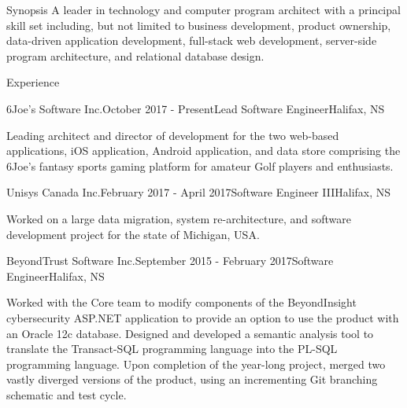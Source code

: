 \documentclass{resume} %
\begin{document}
\begin{rSection}{Synopsis}
A leader in technology and computer program architect with a principal skill set including, but not limited to business development, product ownership, data-driven application development, full-stack web development, server-side program architecture, and relational database design.
\end{rSection}


\begin{rSection}{Experience}

\begin{rSubsection}{6Joe's Software Inc.}{October 2017 - Present}{Lead Software Engineer}{Halifax, NS}

\item[] Leading architect and director of development for the two web-based applications, iOS application, Android application, and data store comprising the 6Joe's fantasy sports gaming platform for amateur Golf players and enthusiasts.

\end{rSubsection}


\begin{rSubsection}{Unisys Canada Inc.}{February 2017 - April 2017}{Software Engineer III}{Halifax, NS}

\item[] Worked on a large data migration, system re-architecture, and software development project for the state of Michigan, USA.

\end{rSubsection}


\begin{rSubsection}{BeyondTrust Software Inc.}{September 2015 - February 2017}{Software Engineer}{Halifax, NS}

\item[] Worked with the Core team to modify components of the BeyondInsight cybersecurity ASP.NET application to provide an option to use the product with an Oracle 12c database. Designed and developed a semantic analysis tool to translate the Transact-SQL programming language into the PL-SQL programming language. Upon completion of the year-long project, merged two vastly diverged versions of the product, using an incrementing Git branching schematic and test cycle.


\end{rSubsection}
\end{rSection}
\end{document}
